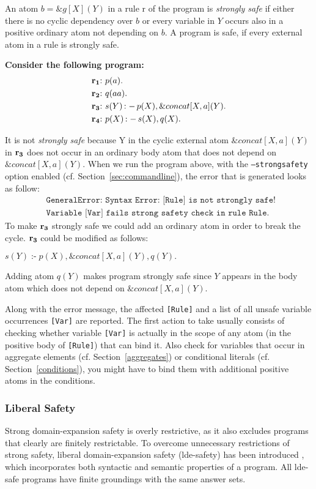 \documentclass[a4paper, titlepage]{article}
\newcommand{\ext}[3]{\ensuremath{\&{#1}[#2](#3)}}
\DeclareMathOperator{\leftimpl}{:-}
\newcommand\mycenterline[1]{\par\smallskip\centerline{#1} \smallskip}
\newcommand{\row}[1]{%
  \ensuremath{\color{black}\ensuremath{\mathbf{#1}} \color{black}}%
}
\newcommand{\rowprefix}[1]{%
  \ensuremath{\color{black}\mathbf{#1{:}}\ }%
}
\begin{document}
An atom $b=\ext{g}{X}{Y}$ in a rule r of the program is \emph{strongly safe} if either there is no cyclic dependency over $b$   or every variable in $Y$ occurs also in a positive ordinary atom not depending on $b$. A program is safe, if every external atom in a rule is strongly safe. 


\begin{exmp} \textbf{Consider the following program:}
\label{strongSafetyExmp}
\begin{align*}
& \rowprefix{r_1} p(a). \\
& \rowprefix{r_2} q(aa). \\
& \rowprefix{r_3} s(Y) \leftimpl p(X), \ext{concat}{X,a}{Y}. \\
& \rowprefix{r_4} p(X) \leftimpl s(X), q(X).
\end{align*}
\end{exmp}
It is not \emph{strongly safe} because Y in the cyclic external atom $\ext{concat}{X,a}{Y}$ in $\row{r_3}$ does not occur in an
ordinary body atom that does not depend on 
\\$\ext{concat}{X,a}{Y}$. When we run the program above, with the \texttt{--strongsafety} option enabled (cf. Section~\ref{sec:commandline}), the error that is generated looks as follow:
\begin{align*}
& \texttt{GeneralError: Syntax Error: [Rule] is not strongly safe! }  \\
& \texttt{Variable [Var] fails strong safety check in rule Rule.}
\end{align*}
To make $\row{r_3}$ strongly safe we could add an ordinary atom in order to break the cycle. $\row{r_3}$ could be modified as follows:\mycenterline{$s(Y) \leftimpl p(X), \ext{concat}{X,a}{Y},q(Y).$} Adding atom $q(Y)$ makes program strongly safe since $Y$ appears in the body atom which does not depend on $\ext{concat}{X,a}{Y}$.
 
Along with the error message, the affected \texttt{[Rule]} and a list of all unsafe variable occurrences \texttt{[Var]} are reported. 
The first action to take usually consists of checking whether variable \texttt{[Var]} is actually in the scope of any atom (in the positive body of \texttt{[Rule]}) that can bind it. Also check for variables that occur in aggregate elements (cf. Section~\ref{aggregates}) or conditional literals (cf. Section~\ref{conditions}), you might have to bind them with additional positive atoms in the conditions. 



\subsubsection{Liberal Safety}
Strong domain-expansion safety is overly restrictive, as it also excludes programs that clearly are finitely
restrictable. To overcome unnecessary restrictions of strong safety, liberal domain-expansion safety (lde-safety)
has been introduced \cite{eite-etal-14a}, which incorporates both syntactic and semantic properties of a program. All lde-safe programs have finite groundings with the same answer sets.
\end{document}
